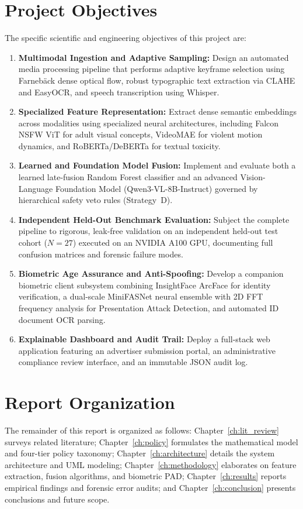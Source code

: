 \documentclass[12pt,a4paper]{report}
\begin{document}
\section{Project Objectives}
The specific scientific and engineering objectives of this project are:
\begin{enumerate}
    \item \textbf{Multimodal Ingestion and Adaptive Sampling:} Design an automated media processing pipeline that performs adaptive keyframe selection using Farneb\"{a}ck dense optical flow, robust typographic text extraction via CLAHE and EasyOCR, and speech transcription using Whisper.
    \item \textbf{Specialized Feature Representation:} Extract dense semantic embeddings across modalities using specialized neural architectures, including Falcon NSFW ViT for adult visual concepts, VideoMAE for violent motion dynamics, and RoBERTa/DeBERTa for textual toxicity.
    \item \textbf{Learned and Foundation Model Fusion:} Implement and evaluate both a learned late-fusion Random Forest classifier and an advanced Vision-Language Foundation Model (Qwen3-VL-8B-Instruct) governed by hierarchical safety veto rules (Strategy~D).
    \item \textbf{Independent Held-Out Benchmark Evaluation:} Subject the complete pipeline to rigorous, leak-free validation on an independent held-out test cohort ($N=27$) executed on an NVIDIA A100 GPU, documenting full confusion matrices and forensic failure modes.
    \item \textbf{Biometric Age Assurance and Anti-Spoofing:} Develop a companion biometric client subsystem combining InsightFace ArcFace for identity verification, a dual-scale MiniFASNet neural ensemble with 2D FFT frequency analysis for Presentation Attack Detection, and automated ID document OCR parsing.
    \item \textbf{Explainable Dashboard and Audit Trail:} Deploy a full-stack web application featuring an advertiser submission portal, an administrative compliance review interface, and an immutable JSON audit log.
\end{enumerate}

\section{Report Organization}
The remainder of this report is organized as follows: Chapter~\ref{ch:lit_review} surveys related literature; Chapter~\ref{ch:policy} formulates the mathematical model and four-tier policy taxonomy; Chapter~\ref{ch:architecture} details the system architecture and UML modeling; Chapter~\ref{ch:methodology} elaborates on feature extraction, fusion algorithms, and biometric PAD; Chapter~\ref{ch:results} reports empirical findings and forensic error audits; and Chapter~\ref{ch:conclusion} presents conclusions and future scope.
\end{document}
